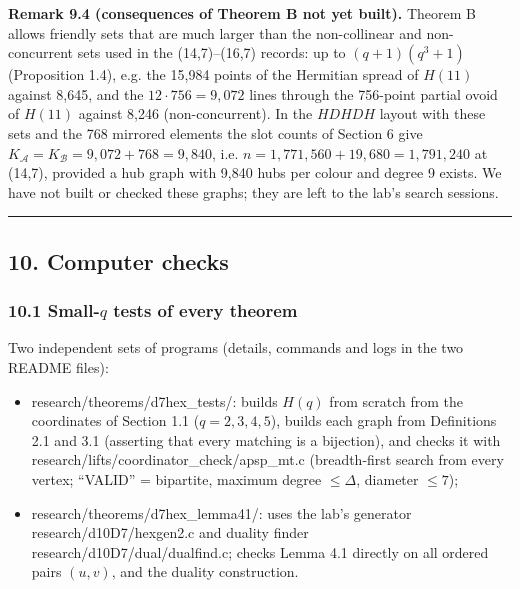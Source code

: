 \documentclass[
  11pt,
]{article}
\providecommand{\tightlist}{%
  \setlength{\itemsep}{0pt}\setlength{\parskip}{0pt}}
\begin{document}
\textbf{Remark 9.4 (consequences of Theorem B not yet built).} Theorem B allows friendly sets that are much larger than
the non-collinear and non-concurrent sets used in the (14,7)--(16,7) records: up to \((q+1)(q^3+1)\) (Proposition 1.4),
e.g. the 15,984 points of the Hermitian spread of \(H(11)\) against 8,645, and the \(12\cdot 756 = 9{,}072\) lines
through the 756-point partial ovoid of \(H(11)\) against 8,246 (non-concurrent). In the \(HDHDH\) layout with these sets
and the 768 mirrored elements the slot counts of Section 6 give
\(K_{\mathcal A} = K_{\mathcal B} = 9{,}072+768 = 9{,}840\), i.e. \(n = 1{,}771{,}560 + 19{,}680 = 1{,}791{,}240\) at
(14,7), provided a hub graph with 9,840 hubs per colour and degree 9 exists. We have not built or checked these graphs;
they are left to the lab's search sessions.

\begin{center}\rule{0.5\linewidth}{0.5pt}\end{center}

\hypertarget{computer-checks}{%
\subsection{10. Computer checks}\label{computer-checks}}

\hypertarget{small-q-tests-of-every-theorem}{%
\subsubsection{\texorpdfstring{10.1 Small-\(q\) tests of every
theorem}{10.1 Small-q tests of every theorem}}\label{small-q-tests-of-every-theorem}}

Two independent sets of programs (details, commands and logs in the two README files):

\begin{itemize}
\tightlist
\item
  research/theorems/d7hex\_tests/: builds \(H(q)\) from scratch from the coordinates of Section 1.1 (\(q = 2,3,4,5\)),
  builds each graph from Definitions 2.1 and 3.1 (asserting that every matching is a bijection), and checks it with
  research/lifts/coordinator\_check/apsp\_mt.c (breadth-first search from every vertex; ``VALID'' = bipartite, maximum
  degree \(\le\Delta\), diameter \(\le 7\));
\item
  research/theorems/d7hex\_lemma41/: uses the lab's generator research/d10D7/hexgen2.c and duality finder
  research/d10D7/dual/dualfind.c; checks Lemma 4.1 directly on all ordered pairs \((u,v)\), and the duality
  construction.
\end{itemize}
\end{document}
